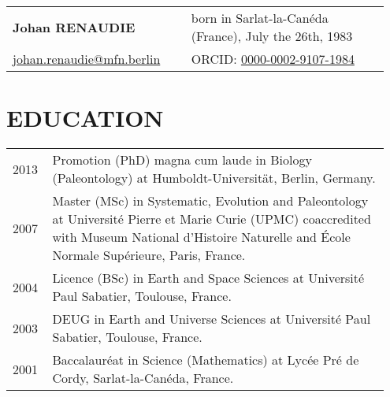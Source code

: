 \documentclass[11pt, a4paper]{article}
\begin{document}
\begin{longtable}{p{0.45\linewidth} >{\raggedleft\arraybackslash}p{0.5\linewidth}}
{\bfseries \Large Johan RENAUDIE} & born in Sarlat-la-Can\'{e}da (France), July the 26th, 1983 \\
\href{mailto:johan.renaudie@mfn.berlin}{johan.renaudie@mfn.berlin} & ORCID: \href{http://orcid.org/0000-0002-9107-1984}{0000-0002-9107-1984}\\
\hline
\end{longtable}

\section{EDUCATION}
\begin{longtable}{p{0.1\linewidth} P{0.85\linewidth}}
2013 & Promotion (PhD) magna cum laude in Biology (Paleontology) at Humboldt-Universit\"{a}t, Berlin, Germany.\\
2007 & Master (MSc) in Systematic, Evolution and Paleontology at Universit\'{e} Pierre et Marie Curie (UPMC) coaccredited with Museum National d'Histoire Naturelle and \'{E}cole Normale Sup\'{e}rieure, Paris, France.\\
2004 & Licence (BSc) in Earth and Space Sciences at Universit\'{e} Paul Sabatier, Toulouse, France.\\
2003 & DEUG in Earth and Universe Sciences at Universit\'{e} Paul Sabatier, Toulouse, France.\\
2001 & Baccalaur\'{e}at in Science (Mathematics) at Lyc\'{e}e Pr\'{e} de Cordy, Sarlat-la-Can\'{e}da, France.\\
\end{longtable}
\end{document}
